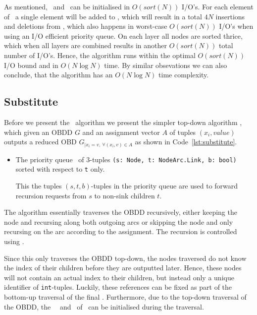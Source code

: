 \clearpage
As mentioned, \ReduceLwork\ and \ReduceLdep\ can be initialised in $O(sort(N))$
I/O's. For each element of \ReduceLdep\ a single element will be added to
\ReduceQdep, which will result in a total $4 N$ insertions and deletions from
\ReduceQdep, which also happens in worst-case $O(sort(N))$ I/O's when using an
I/O efficient priority queue. On each layer all nodes are sorted thrice, which
when all layers are combined results in another $O(sort(N))$ total number of I/O's.
Hence, the algorithm runs within the optimal $O(sort(N))$ I/O bound and in $O(N
\log N)$ time. \cite{Arge96} By similar obsevations we can also conclude, that
the algorithm has an $O(N \log N)$ time complexity.

\subsection{Substitute} \label{sec:theory_substitute}
Before we present the \Apply\ algorithm we present the simpler top-down
algorithm \Substitute, which given an OBDD $G$ and an assignment vector $A$ of
tuples $(x_i, \mathit{value})$ outputs a reduced OBD $G_{| x_i = v ,\ \forall
  (x_i,v) \in A}$ as shown in Code~\ref{lst:substitute}.

\begin{itemize}
\item The priority queue \Q\ of 3-tuples
  \lstinline{(s: Node, t: NodeArc.Link, b: bool)} sorted with
  respect to \lstinline{t} only.

  This the tuples $(s,t,b)$-tuples in the priority queue are used to forward
  recursion requests from $s$ to non-sink children $t$.
\end{itemize}

The algorithm essentially traverses the OBDD recursively, either keeping the
node and recursing along both outgoing arcs or skipping the node and only
recursing on the arc according to the assignment. The recursion is controlled
using \Q.

Since this only traverses the OBDD top-down, the nodes traversed do not know the
index of their children before they are outputted later. Hence, these nodes will
not contain an actual index to their children, but instead only a unique
identifier of \lstinline{int}-tuples. Luckily, these references
can be fixed as part of the bottom-up traversal of the final \Reduce.
Furthermore, due to the top-down traversal of the OBDD, the \ReduceLwork\,
\ReduceLdep\ and \Q\ of \Reduce\ can be initialised during the traversal.


